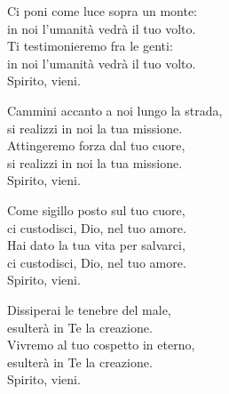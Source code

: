 

\spazio

\strofa Ci poni come luce sopra un monte:\\
in noi l'umanità vedrà il tuo volto.\\
Ti testimonieremo fra le genti:\\
in noi l'umanità vedrà il tuo volto.\\
Spirito, vieni.

\spazio


\spazio

\strofa Cammini accanto a noi lungo la strada,\\
si realizzi in noi la tua missione.\\
Attingeremo forza dal tuo cuore,\\
si realizzi in noi la tua missione.\\
Spirito, vieni.

\spazio


\spazio

\strofa Come sigillo posto sul tuo cuore,\\
ci custodisci, Dio, nel tuo amore.\\
Hai dato la tua vita per salvarci,\\
ci custodisci, Dio, nel tuo amore.\\
Spirito, vieni.

\spazio


\spazio

\strofa Dissiperai le tenebre del male,\\
esulterà in Te la creazione.\\
Vivremo al tuo cospetto in eterno,\\
esulterà in Te la creazione.\\
Spirito, vieni.

\spazio


\spazio

